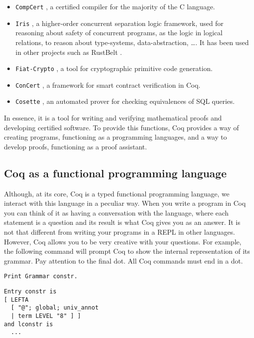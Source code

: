 \begin{itemize}
    \item \verb|CompCert| \cite{CompCert}, 
    a certified compiler for the majority of the C language.
    
    \item \verb|Iris| \cite{Iris}, 
    a higher-order concurrent separation logic framework, used for reasoning about safety of concurrent programs, as the logic in logical relations, to reason about type-systems, data-abstraction, \dots. It has been used in other projects such as RustBelt \cite{RustBelt}.
    
    \item \verb|Fiat-Crypto| \cite{FiatCryptoSP19}, 
    a tool for cryptographic primitive code generation.
    
    \item \verb|ConCert| \cite{ConCert}, 
    a framework for smart contract verification in Coq.
    
    \item \verb|Cosette| \cite{Cosette}, 
    an automated prover for checking equivalences of SQL queries.
\end{itemize}

In essence, it is a tool for writing and verifying mathematical proofs and developing certified software.
To provide this functions, Coq provides a way of creating programs, functioning as a programming 
languages, and a way to develop proofs, functioning as a proof assistant.


\subsection{Coq as a functional programming language}
\label{sect:coq-programming-language}

Although, at its core, Coq is a typed functional programming language, we interact with this language
in a peculiar way. When you write a program in Coq you can think of it as having a conversation with the
language, where each statement is a question and its result is what Coq gives you as an answer. It is not
that different from writing your programs in a REPL in other languages. However, Coq  allows you to be
very creative with your questions. For example, the following command will prompt Coq to show the internal
representation of its grammar. Pay attention to the final dot. All Coq commands must end in a dot.

\begin{verbatim}
Print Grammar constr.
\end{verbatim}
\begin{verbatim}
Entry constr is
[ LEFTA
  [ "@"; global; univ_annot
  | term LEVEL "8" ] ]
and lconstr is
  ...
\end{verbatim}

